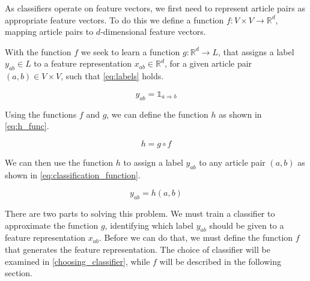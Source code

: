 As classifiers operate on feature vectors, we first need to represent article pairs as appropriate feature vectors. To do this we define a function $f: V\times V \to \mathbb{R}^d$, mapping article pairs to $d$-dimensional feature vectors.

With the function $f$ we seek to learn a function $g: \mathbb{R}^d \to L$, that assigns a label $y_{ab} \in L$ to a feature representation $x_{ab} \in \mathbb{R}^d$, for a given article pair $(a,b) \in V \times V$, such that \cref{eq:labels} holds.

\begin{equation}
\label{eq:labels}
y_{ab}=\mathbb{1}_{a \Rightarrow b}
\end{equation}


Using the functions $f$ and $g$, we can define the function $h$ as shown in \cref{eq:h_func}.

\begin{equation}
\label{eq:h_func}
  h = g \circ f
\end{equation}

We can then use the function $h$ to assign a label $y_{ab}$ to any article pair $(a,b)$ as shown in \cref{eq:classification_function}.

\begin{equation}
\label{eq:classification_function}
  y_{ab} = h(a,b)
\end{equation}

There are two parts to solving this problem. We must train a classifier to approximate the function $g$, identifying which label $y_{ab}$ should be given to a feature representation $x_{ab}$. Before we can do that, we must define the function $f$ that generates the feature representation. The choice of classifier will be examined in \cref{choosing_classifier}, while $f$ will be described in the following section.



